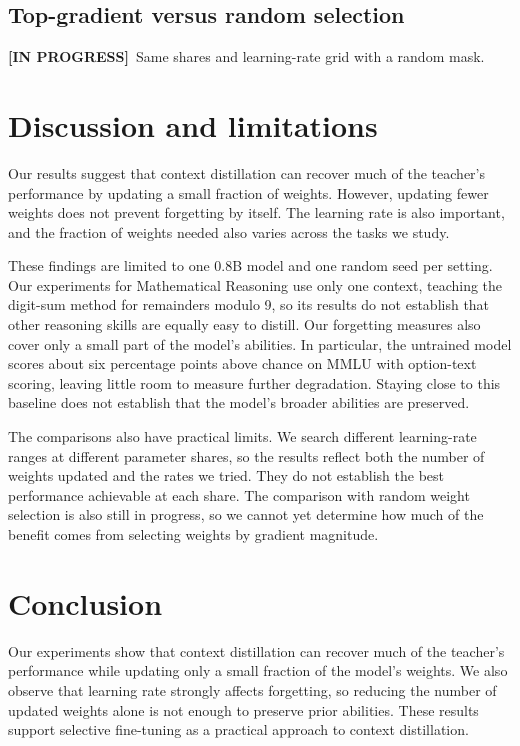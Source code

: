 \documentclass{article} %
\newcommand{\todo}[1]{{\color{red}[TODO: #1]}}
\newcommand{\inprogress}{{\color{orange}\textbf{[IN PROGRESS]}}}
\begin{document}
\subsection{Top-gradient versus random selection}
\inprogress\ Same shares and learning-rate grid with a random mask.

\section{Discussion and limitations}
\label{sec:discussion}
Our results suggest that context distillation can recover much of the teacher's performance by updating a small fraction of weights. However, updating fewer weights does not prevent forgetting by itself. The learning rate is also important, and the fraction of weights needed also varies across the tasks we study.

These findings are limited to one 0.8B model and one random seed per setting. Our experiments for Mathematical Reasoning use only one context, teaching the digit-sum method for remainders modulo 9, so its results do not establish that other reasoning skills are equally easy to distill. Our forgetting measures also cover only a small part of the model's abilities. In particular, the untrained model scores about six percentage points above chance on MMLU with option-text scoring, leaving little room to measure further degradation. Staying close to this baseline does not establish that the model's broader abilities are preserved.

The comparisons also have practical limits. We search different learning-rate ranges at different parameter shares, so the results reflect both the number of weights updated and the rates we tried. They do not establish the best performance achievable at each share. The comparison with random weight selection is also still in progress, so we cannot yet determine how much of the benefit comes from selecting weights by gradient magnitude.

\section{Conclusion}
\label{sec:conclusion}

Our experiments show that context distillation can recover much of the teacher’s performance while updating only a small fraction of the model’s weights. We also observe that learning rate strongly affects forgetting, so reducing the number of updated weights alone is not enough to preserve prior abilities. These results support selective fine-tuning as a practical approach to context distillation.
\end{document}
